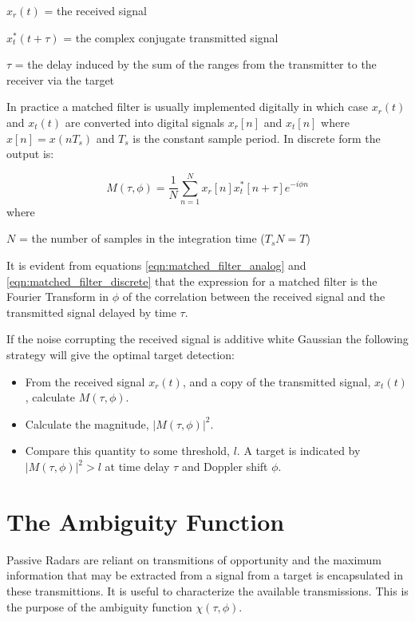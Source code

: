 \documentclass[a4paper]{report}
\numberwithin{equation}{chapter}
\begin{document}
$x_r(t)$ = the received signal

$x_t^*(t + \tau)$ = the complex conjugate transmitted signal

$\tau$ = the delay induced by the sum of the ranges from the transmitter to the receiver via the target

\bigskip

In practice a matched filter is usually implemented digitally in which case $x_r(t)$ and $x_t(t)$ are converted into digital signals $x_r[n]$ and $x_t[n]$ where $x[n] = x(nT_s)$ and $T_s$ is the constant sample period. In discrete form the output is:

\begin{equation}
M(\tau, \phi) = \frac{1}{N} \sum_{n=1}^{N} x_r[n] x_t^*[n + \tau]e^{-i\phi n}
\label{eqn:matched_filter_discrete}
\end{equation}
where

$N$ = the number of samples in the integration time ($T_sN = T$)

\bigskip

It is evident from equations \ref{eqn:matched_filter_analog} and \ref{eqn:matched_filter_discrete} that the expression for a matched filter is the Fourier Transform in $\phi$ of the correlation between the received signal and the transmitted signal delayed by time $\tau$.

\bigskip

If the noise corrupting the received signal is additive white Gaussian the following strategy will give the optimal target detection:

\begin{itemize}
\item{From the received signal $x_r(t)$, and a copy of the transmitted signal, $x_t(t)$, calculate $M(\tau, \phi)$.}
\item{Calculate the magnitude, $|M(\tau, \phi)|^2$.}
\item{Compare this quantity to some threshold, $l$. A target is indicated by $|M(\tau, \phi)|^2 > l$ at time delay $\tau$ and Doppler shift $\phi$.}
\end{itemize}

\section[The Ambiguity Function]{The Ambiguity Function}
Passive Radars are reliant on transmitions of opportunity and the maximum information that may be extracted from a signal from a target is encapsulated in these transmittions. It is useful to characterize the available transmissions. This is the purpose of the ambiguity function $\chi(\tau, \phi)$.
\end{document}
